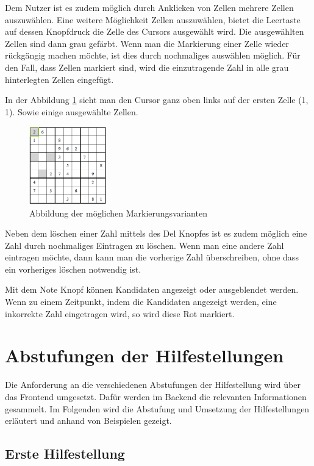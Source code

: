 Dem Nutzer ist es zudem möglich durch Anklicken von Zellen mehrere Zellen auszuwählen. Eine weitere Möglichkeit Zellen auszuwählen, bietet die Leertaste auf dessen Knopfdruck die Zelle des Cursors ausgewählt wird. Die ausgewählten Zellen sind dann grau gefärbt. Wenn man die Markierung einer Zelle wieder rückgängig machen möchte, ist dies durch nochmaliges auswählen möglich. Für den Fall, dass Zellen markiert sind, wird die einzutragende Zahl in alle grau hinterlegten Zellen eingefügt.

In der Abbildung \ref{fig:Markierungen} sieht man den Cursor ganz oben links auf der ersten Zelle (1, 1). Sowie einige ausgewählte Zellen.

\begin{figure}[htbp]
	\centering
	\includegraphics[width=0.3\textwidth]{images/Markierungen.png}
	\caption{Abbildung der möglichen Markierungsvarianten}
	\label{fig:Markierungen}
\end{figure}

Neben dem löschen einer Zahl mittels des Del Knopfes ist es zudem möglich eine Zahl durch nochmaliges Eintragen zu löschen. Wenn man eine andere Zahl eintragen möchte, dann kann man die vorherige Zahl überschreiben, ohne dass ein vorheriges löschen notwendig ist. 

Mit dem Note Knopf können Kandidaten angezeigt oder ausgeblendet werden. Wenn zu einem Zeitpunkt, indem die Kandidaten angezeigt werden, eine inkorrekte Zahl eingetragen wird, so wird diese Rot markiert.


\section{Abstufungen der Hilfestellungen}\label{Abstufung}
Die Anforderung an die verschiedenen Abstufungen der Hilfestellung wird über das Frontend umgesetzt. Dafür werden im Backend die relevanten Informationen gesammelt. Im Folgenden wird die Abstufung und Umsetzung der Hilfestellungen erläutert und anhand von Beispielen gezeigt.

\subsection{Erste Hilfestellung}

